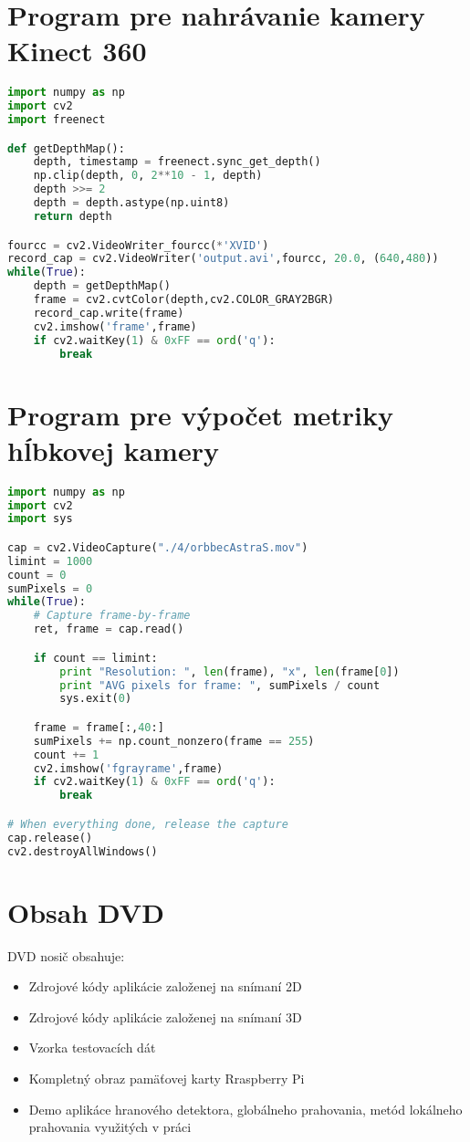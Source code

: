 \chapter{Program pre nahrávanie kamery Kinect 360}
\label{pr:kinect}
\begin{lstlisting}[language=Python]
import numpy as np
import cv2
import freenect

def getDepthMap():    
    depth, timestamp = freenect.sync_get_depth()
    np.clip(depth, 0, 2**10 - 1, depth)
    depth >>= 2
    depth = depth.astype(np.uint8)
    return depth

fourcc = cv2.VideoWriter_fourcc(*'XVID')
record_cap = cv2.VideoWriter('output.avi',fourcc, 20.0, (640,480))
while(True):
	depth = getDepthMap()
	frame = cv2.cvtColor(depth,cv2.COLOR_GRAY2BGR)
	record_cap.write(frame)
	cv2.imshow('frame',frame)
	if cv2.waitKey(1) & 0xFF == ord('q'):
	    break
\end{lstlisting}


\chapter{Program pre výpočet metriky hĺbkovej kamery}
\label{pr:metric}
\begin{lstlisting}[language=Python]
import numpy as np
import cv2
import sys

cap = cv2.VideoCapture("./4/orbbecAstraS.mov")
limint = 1000
count = 0
sumPixels = 0 
while(True):
    # Capture frame-by-frame
    ret, frame = cap.read()

    if count == limint:
        print "Resolution: ", len(frame), "x", len(frame[0]) 
        print "AVG pixels for frame: ", sumPixels / count
        sys.exit(0)

    frame = frame[:,40:]
    sumPixels += np.count_nonzero(frame == 255)
    count += 1
    cv2.imshow('fgrayrame',frame)
    if cv2.waitKey(1) & 0xFF == ord('q'):
        break

# When everything done, release the capture
cap.release()
cv2.destroyAllWindows()
\end{lstlisting}

\chapter{Obsah DVD}
\label{pr:CD}
DVD nosič obsahuje: 
\begin{itemize}
    \item Zdrojové kódy aplikácie založenej na snímaní 2D
    \item Zdrojové kódy aplikácie založenej na snímaní 3D
    \item Vzorka testovacích dát 
    \item Kompletný obraz pamäťovej karty Rraspberry Pi
    \item Demo aplikáce hranového detektora, globálneho prahovania, metód lokálneho prahovania využitých v práci
    
\end{itemize}
\label{pr:metric}